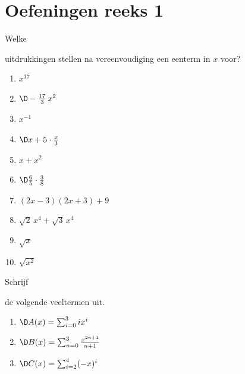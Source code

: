 \documentclass{ximera}
\begin{document}

{}
\section*{Oefeningen reeks 1}

\begin{Oefening}\setcounter{enumi}{1} 
\hypertarget{oef1.1}{Welke} uitdrukkingen stellen na vereenvoudiging een eenterm in $x$ voor? 
\begin{multicols}{2}
\begin{enumerate}

\item
$x^{17}$
\item
$\D -\frac{17}{3}\,x^2$
\item
$x^{-1}$
\item
$\D x + 5\cdot \frac{x}{3}$
\item
$x + x^2$
\item
$\D \frac{6}{5}\cdot\frac{3}{8}$
\item
$(2x-3)(2x+3)+9$
\item
$\sqrt{2}\,x^4 + \sqrt{3}\,x^4$
\item
$\sqrt{x}$
\item
$\sqrt{x^2}$
\end{enumerate}
\end{multicols}
\end{Oefening}

\begin{Oefening}\setcounter{enumi}{2}
\hypertarget{oef1.2}{Schrijf} de volgende veeltermen uit.
\begin{enumerate}

\item
$\D A(x) = \sum_{i=0}^3 ix^i$
\item
$\D B(x) = \sum_{n=0}^3 \frac{x^{2n+1}}{n+1}$
\item
$\D C(x) = \sum_{i=2}^4 (-x)^i$
\end{enumerate}
\end{Oefening}
\end{document}
